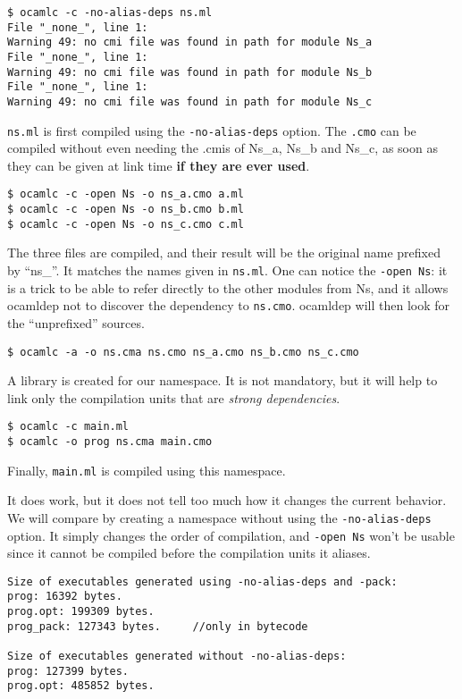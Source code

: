 \begin{verbatim}
$ ocamlc -c -no-alias-deps ns.ml
File "_none_", line 1:
Warning 49: no cmi file was found in path for module Ns_a
File "_none_", line 1:
Warning 49: no cmi file was found in path for module Ns_b
File "_none_", line 1:
Warning 49: no cmi file was found in path for module Ns_c
\end{verbatim}

\texttt{ns.ml} is first compiled using the \texttt{-no-alias-deps} option. The
\texttt{.cmo} can be compiled without even needing the .cmis of Ns\_a, Ns\_b and
Ns\_c, as soon as they can be given at link time \textbf{if they are ever
  used}.

\begin{verbatim}
$ ocamlc -c -open Ns -o ns_a.cmo a.ml
$ ocamlc -c -open Ns -o ns_b.cmo b.ml
$ ocamlc -c -open Ns -o ns_c.cmo c.ml
\end{verbatim}

The three files are compiled, and their result will be the original name
prefixed by ``ns\_''. It matches the names given in \texttt{ns.ml}. One can
notice the \texttt{-open Ns}: it is a trick to be able to refer directly to the
other modules from Ns, and it allows ocamldep not to discover the dependency to
\texttt{ns.cmo}. ocamldep will then look for the ``unprefixed'' sources. 

\begin{verbatim}
$ ocamlc -a -o ns.cma ns.cmo ns_a.cmo ns_b.cmo ns_c.cmo
\end{verbatim}

A library is created for our namespace. It is not mandatory, but it will help to
link only the compilation units that are \emph{strong dependencies}.

\begin{verbatim}
$ ocamlc -c main.ml
$ ocamlc -o prog ns.cma main.cmo
\end{verbatim}

Finally, \texttt{main.ml} is compiled using this namespace.

It does work, but it does not tell too much how it changes the current
behavior. We will compare by creating a namespace without using the
\texttt{-no-alias-deps} option. It simply changes the order of compilation, and
\texttt{-open Ns} won't be usable since it cannot be compiled before the
compilation units it aliases.

\begin{verbatim}
Size of executables generated using -no-alias-deps and -pack:
prog: 16392 bytes.
prog.opt: 199309 bytes.
prog_pack: 127343 bytes.     //only in bytecode

Size of executables generated without -no-alias-deps:
prog: 127399 bytes.
prog.opt: 485852 bytes.
\end{verbatim}

